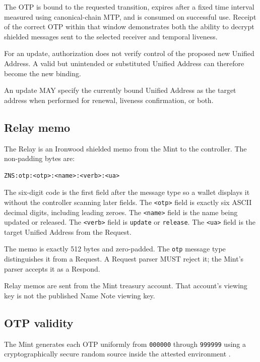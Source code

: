 The OTP is bound to the requested transition, expires after a fixed time interval measured using canonical-chain MTP, and is consumed on successful use. Receipt of the correct OTP within that window demonstrates both the ability to decrypt shielded messages sent to the selected receiver and temporal liveness.

For an update, authorization does not verify control of the proposed new Unified Address. A valid but unintended or substituted Unified Address can therefore become the new binding.

An update MAY specify the currently bound Unified Address as the target address when performed for renewal, liveness confirmation, or both.

\subsection{Relay memo}

The Relay is an Ironwood shielded memo from the Mint to the controller. The non-padding bytes are:

\begin{verbatim}
ZNS:otp:<otp>:<name>:<verb>:<ua>
\end{verbatim}

The six-digit code is the first field after the message type so a wallet displays it without the controller scanning later fields. The \texttt{<otp>} field is exactly six ASCII decimal digits, including leading zeroes. The \texttt{<name>} field is the name being updated or released. The \texttt{<verb>} field is \texttt{update} or \texttt{release}. The \texttt{<ua>} field is the target Unified Address from the Request.

The memo is exactly 512 bytes and zero-padded. The \texttt{otp} message type distinguishes it from a Request. A Request parser MUST reject it; the Mint's parser accepts it as a Respond.

Relay memos are sent from the Mint treasury account. That account's viewing key is not the published Name Note viewing key.

\subsection{OTP validity}

The Mint generates each OTP uniformly from \texttt{000000} through \texttt{999999} using a cryptographically secure random source inside the attested environment \cite{zns-mint}.

